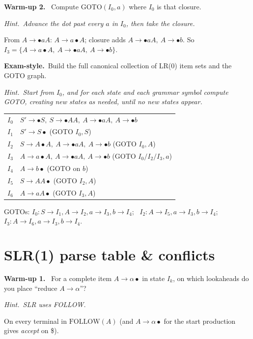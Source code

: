 \documentclass[11pt,a4paper]{article}
\newcommand{\hint}[1]{\par{\small\textcolor{accent}{\textit{Hint.}}\ \textit{#1}}\par\smallskip}
\newcommand{\warm}[1]{\smallskip\textbf{\textcolor{hi}{Warm-up #1.}}\ }
\newcommand{\exam}{\smallskip\textbf{\textcolor{warn}{Exam-style.}}\ }
\begin{document}
\warm{2} Compute $\mathrm{GOTO}(I_0,a)$ where $I_0$ is that closure.
\hint{Advance the dot past every $a$ in $I_0$, then take the closure.}
\begin{sol}
From $A\to{\bullet}aA$: $A\to a{\bullet}A$; closure adds $A\to{\bullet}aA,\ A\to{\bullet}b$. So $I_3=\{A\to a{\bullet}A,\ A\to{\bullet}aA,\ A\to{\bullet}b\}$.
\end{sol}

\exam Build the full canonical collection of LR(0) item sets and the GOTO graph.
\hint{Start from $I_0$, and for each state and each grammar symbol compute GOTO, creating new states as needed, until no new states appear.}
\begin{sol}
\begin{center}\small
\begin{tabular}{ll}
$I_0$ & $S'\to{\bullet}S,\ S\to{\bullet}AA,\ A\to{\bullet}aA,\ A\to{\bullet}b$\\
$I_1$ & $S'\to S{\bullet}$ \hfill (GOTO $I_0,S$)\\
$I_2$ & $S\to A{\bullet}A,\ A\to{\bullet}aA,\ A\to{\bullet}b$ \hfill (GOTO $I_0,A$)\\
$I_3$ & $A\to a{\bullet}A,\ A\to{\bullet}aA,\ A\to{\bullet}b$ \hfill (GOTO $I_0/I_2/I_3,a$)\\
$I_4$ & $A\to b{\bullet}$ \hfill (GOTO on $b$)\\
$I_5$ & $S\to AA{\bullet}$ \hfill (GOTO $I_2,A$)\\
$I_6$ & $A\to aA{\bullet}$ \hfill (GOTO $I_3,A$)\\
\end{tabular}
\end{center}
GOTOs: $I_0\!:S{\to}I_1,A{\to}I_2,a{\to}I_3,b{\to}I_4$; \ $I_2\!:A{\to}I_5,a{\to}I_3,b{\to}I_4$; \ $I_3\!:A{\to}I_6,a{\to}I_3,b{\to}I_4$.
\end{sol}

\section{SLR(1) parse table \& conflicts}

\warm{1} For a complete item $A\to\alpha{\bullet}$ in state $I_k$, on which lookaheads do you place ``reduce $A\to\alpha$''?
\hint{SLR uses FOLLOW.}
\begin{sol}
On every terminal in $\mathrm{FOLLOW}(A)$ (and $A\to\alpha{\bullet}$ for the start production gives \emph{accept} on \$).
\end{sol}
\end{document}
